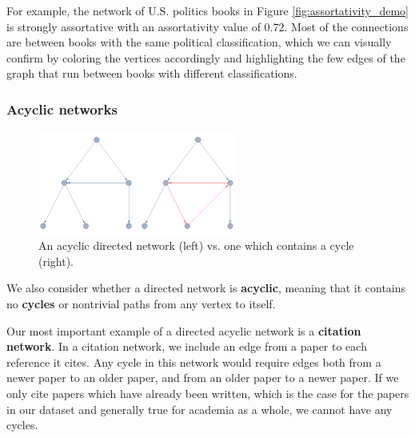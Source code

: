\documentclass[12pt]{thesis}
\theoremstyle{plain}
\theoremstyle{definition}
\theoremstyle{remark}
\begin{document}
For example, the network of U.S. politics books in Figure \ref{fig:assortativity_demo} is strongly assortative with an assortativity value of $0.72$. Most of the connections are between books with the same political classification, which we can visually confirm by coloring the vertices accordingly and highlighting the few edges of the graph that run between books with different classifications.

\subsubsection{Acyclic networks}

\begin{figure}[t]
\centering
\includegraphics[width=0.58\textwidth]{acyclic_demo.png}
\caption{An acyclic directed network (left) vs. one which contains a cycle (right).}
\label{fig:acyclic_demo}
\end{figure}

We also consider whether a directed network is \textbf{acyclic}, meaning that it contains no \textbf{cycles} or nontrivial paths from any vertex to itself.

Our most important example of a directed acyclic network is a \textbf{citation network}. In a citation network, we include an edge from a paper to each reference it cites. Any cycle in this network would require edges both from a newer paper to an older paper, and from an older paper to a newer paper. If we only cite papers which have already been written, which is the case for the papers in our dataset and generally true for academia as a whole, we cannot have any cycles. 








\end{document}
